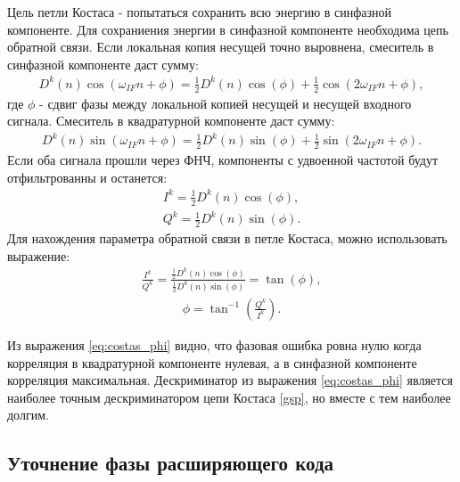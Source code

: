 Цель петли Костаса - попытаться сохранить всю энергию в синфазной компоненте. Для сохраниения энергии в синфазной
компоненте необходима цепь обратной связи. Если локальная копия несущей точно выровнена, смеситель в 
синфазной компоненте даст сумму:
\begin{eqnarray}
D^k(n)\cos(\omega_{IF}n + \phi) = \frac{1}{2}D^k(n)\cos(\phi) + \frac{1}{2}\cos(2\omega_{IF}n + \phi),
\label{eq:costas_i}
\end{eqnarray}
где ${\phi}$ - сдвиг фазы между локальной копией несущей и несущей входного сигнала. Смеситель в квадратурной
компоненте даст сумму:
\begin{eqnarray}
D^k(n)\sin(\omega_{IF}n + \phi) = \frac{1}{2}D^k(n)\sin(\phi) + \frac{1}{2}\sin(2\omega_{IF}n + \phi).
\label{eq:costas_q}
\end{eqnarray}
Если оба сигнала прошли через ФНЧ, компоненты с удвоенной частотой будут отфильтрованны и останется:
\begin{eqnarray}
I^k = \frac{1}{2}D^k(n)\cos(\phi), \\
Q^k = \frac{1}{2}D^k(n)\sin(\phi).
\label{eq:costas_iq}
\end{eqnarray}
Для нахождения параметра обратной связи в петле Костаса, можно использовать выражение:
\begin{eqnarray}
\frac{I^k}{Q^k} = \frac{\frac{1}{2}D^k(n)\cos(\phi)}{\frac{1}{2}D^k(n)\sin(\phi)} = \tan(\phi),
\label{eq:costas_descr}
\end{eqnarray}
\begin{eqnarray}
\phi = \tan^{-1}({\frac{Q^k}{I^k}}).
\label{eq:costas_phi}
\end{eqnarray}

Из выражения \ref{eq:costas_phi} видно, что фазовая ошибка ровна нулю когда корреляция в квадратурной
компоненте нулевая, а в синфазной компоненте корреляция максимальная. Дескриминатор из выражения \ref{eq:costas_phi}
является наиболее точным дескриминатором цепи Костаса \ref{gsp}, но вместе с тем наиболее долгим.
\subsection{Уточнение фазы расширяющего кода}

\newpage
